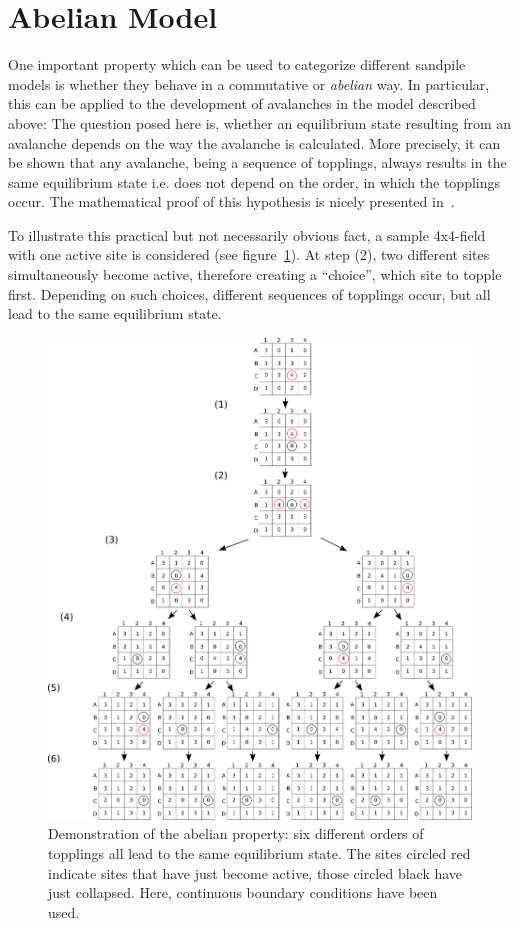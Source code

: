 \section{Abelian Model}
One important property which can be used to categorize different sandpile models is whether they behave in a commutative or \emph{abelian} way. In particular, this can be applied to the development of avalanches in the model described above: The question posed here is, whether an equilibrium state resulting from an avalanche depends on the way the avalanche is calculated. More precisely, it can be shown that any avalanche, being a sequence of topplings, always results in the same equilibrium state i.e. does not depend on the order, in which the topplings occur. The mathematical proof of this hypothesis is nicely presented in~\cite{sandpile_math}.

To illustrate this practical but not necessarily obvious fact, a sample 4x4-field with one active site is considered (see figure~\ref{pics:abelian}). At step (2), two different sites simultaneously become active, therefore creating a ``choice'', which site to topple first. Depending on such choices, different sequences of topplings occur, but all lead to the same equilibrium state.

\begin{figure}[!htpb]
\centering
\includegraphics[width=\textwidth]{pics/pic1_abelian.pdf}
\caption[]{Demonstration of the abelian property: six different orders of topplings all lead to the same equilibrium state. The sites circled red indicate sites that have just become active, those circled black have just collapsed. Here, continuous boundary conditions have been used.}
\label{pics:abelian}
\end{figure}
